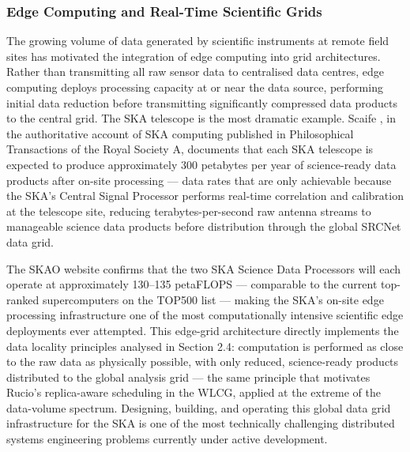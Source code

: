\documentclass[12pt,a4paper]{report}
\begin{document}
\subsubsection{Edge Computing and Real-Time Scientific Grids}
The growing volume of data generated by scientific instruments at remote field sites has motivated the integration of edge computing into grid
 architectures. Rather than transmitting all raw sensor data to centralised data centres, edge computing deploys processing capacity at or near 
 the data source, performing initial data reduction before transmitting significantly compressed data products to the central grid. The SKA 
 telescope is the most dramatic example. Scaife \parencite{scaife2020}, in the authoritative account of SKA computing published in Philosophical Transactions 
 of the Royal Society A, documents that each SKA telescope is expected to produce approximately 300 petabytes per year of science-ready data 
 products after on-site processing — data rates that are only achievable because the SKA’s Central Signal Processor performs real-time correlation 
 and calibration at the telescope site, reducing terabytes-per-second raw antenna streams to manageable science data products before distribution 
 through the global SRCNet data grid. 
 
 The SKAO website confirms that the two SKA Science Data Processors will each operate at approximately 130–135 
 petaFLOPS — comparable to the current top-ranked supercomputers on the TOP500 list — making the SKA’s on-site edge processing infrastructure one of
  the most computationally intensive scientific edge deployments ever attempted. This edge-grid architecture directly implements the data locality
   principles analysed in Section 2.4: computation is performed as close to the raw data as physically possible, with only reduced, science-ready 
   products distributed to the global analysis grid — the same principle that motivates Rucio’s replica-aware scheduling in the WLCG, applied at 
   the extreme of the data-volume spectrum. Designing, building, and operating this global data grid infrastructure for the SKA is one of the most
    technically challenging distributed systems engineering problems currently under active development.
\end{document}
